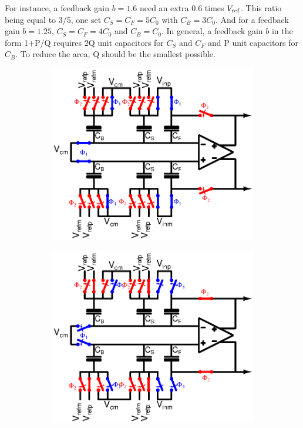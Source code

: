 For instance, a feedback gain $b = 1.6$ need an extra 0.6 times \(V_{\rm ref}\). This ratio being equal to 3/5, one set $C_S = C_F = 5 C_0$ with $C_B = 3 C_0$. And for a feedback gain $b = 1.25$, $C_S = C_F = 4 C_0$ and $C_B = C_0$. In general, a feedback gain $b$ in the form 1+P/Q requires 2Q unit capacitors for $C_S$ and $C_F$ and P unit capacitors for $C_B$. To reduce the area, Q should be the smallest possible.

\begin{figure}[htp]
	\centering
	\begin{subfigure}[b]{0.45\textwidth}
		\centering
		\includegraphics[width=\textwidth]{Chapter4/Figs/algorithmic-Cb-phi1.ps}
		\label{fig:algo-mdac-phi1}
	\end{subfigure}
	\begin{subfigure}[b]{0.45\textwidth}
		\centering
		\includegraphics[width=\textwidth]{Chapter4/Figs/algorithmic-Cb-phi2.ps}

\end{subfigure}
\end{figure}
